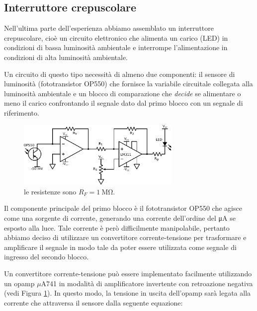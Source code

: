 \subsection{Interruttore crepuscolare}

Nell'ultima parte dell'esperienza abbiamo assemblato un interruttore crepuscolare, cioè un circuito elettronico che alimenta un carico (LED) in condizioni di bassa luminosità ambientale e interrompe l'alimentazione in condizioni di alta luminosità ambientale.

Un circuito di questo tipo necessità di almeno due componenti: il sensore di luminosità (fototransistor OP550) che fornisce la variabile circuitale collegata alla luminosità ambientale e un blocco di comparazione che \textit{decide} se alimentare o meno il carico confrontando il segnale dato dal primo blocco con un segnale di riferimento.

\begin{figure}
	\begin{center}
		\includegraphics[width=0.7\textwidth]{../E04/latex/c_crepuscolare.pdf}
	\end{center}
	\caption{le resistenze sono $R_F = \SI{1}{\Mohm}$.}
	\label{cir4:crepuscolare}
\end{figure}

Il componente principale del primo blocco è il fototransistor OP550 che agisce come una sorgente di corrente, generando una corrente dell'ordine del \si{\uA} se esposto alla luce.
Tale corrente è però difficilmente manipolabile, pertanto abbiamo deciso di utilizzare un convertitore corrente-tensione per trasformare e amplificare il segnale in modo tale da poter essere utilizzata come segnale di ingresso del secondo blocco.

Un convertitore corrente-tensione può essere implementato facilmente utilizzando un opamp $\mu$A741 in modalità di amplificatore invertente con retroazione negativa (vedi Figura \ref{cir4:crepuscolare}).
In questo modo, la tensione in uscita dell'opamp sarà legata alla corrente che attraversa il sensore dalla seguente equazione:

